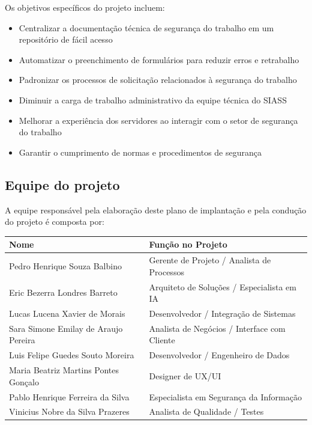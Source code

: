 \documentclass[12pt,a4paper]{article}
\begin{document}
Os objetivos específicos do projeto incluem:

\begin{itemize}
    \item Centralizar a documentação técnica de segurança do trabalho em um repositório de fácil acesso
    \item Automatizar o preenchimento de formulários para reduzir erros e retrabalho
    \item Padronizar os processos de solicitação relacionados à segurança do trabalho
    \item Diminuir a carga de trabalho administrativo da equipe técnica do SIASS
    \item Melhorar a experiência dos servidores ao interagir com o setor de segurança do trabalho
    \item Garantir o cumprimento de normas e procedimentos de segurança
\end{itemize}

\subsection{Equipe do projeto}
A equipe responsável pela elaboração deste plano de implantação e pela condução do projeto é composta por:

\begin{table}[h]
\centering
\begin{tabular}{|p{5cm}|p{8cm}|}
\hline
\textbf{Nome} & \textbf{Função no Projeto} \\
\hline
Pedro Henrique Souza Balbino & Gerente de Projeto / Analista de Processos \\
\hline
Eric Bezerra Londres Barreto & Arquiteto de Soluções / Especialista em IA \\
\hline
Lucas Lucena Xavier de Morais & Desenvolvedor / Integração de Sistemas \\
\hline
Sara Simone Emilay de Araujo Pereira & Analista de Negócios / Interface com Cliente \\
\hline
Luis Felipe Guedes Souto Moreira & Desenvolvedor / Engenheiro de Dados \\
\hline
Maria Beatriz Martins Pontes Gonçalo & Designer de UX/UI \\
\hline
Pablo Henrique Ferreira da Silva & Especialista em Segurança da Informação \\
\hline
Vinicius Nobre da Silva Prazeres & Analista de Qualidade / Testes \\
\hline
\end{tabular}
\end{table}
\end{document}
